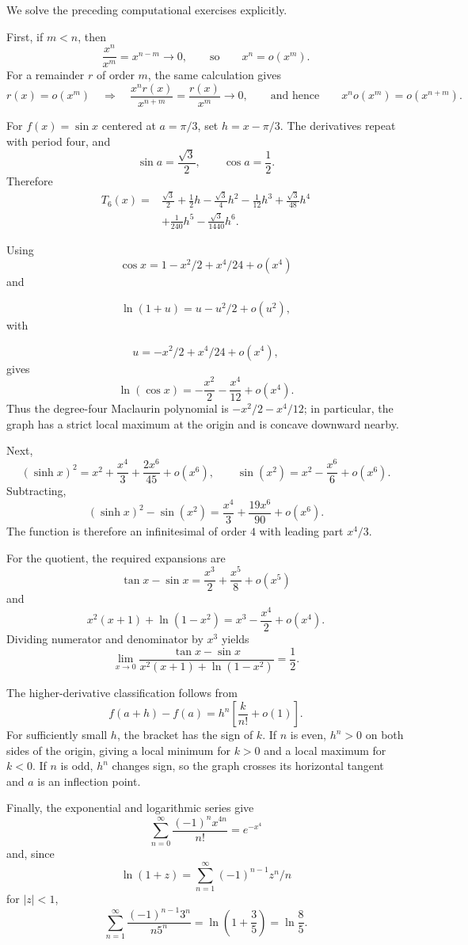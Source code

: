 \begin{remark}
We solve the preceding computational exercises explicitly.

First, if $m<n$, then
\[
\frac{x^n}{x^m}=x^{n-m}\longrightarrow0,
\qquad\text{so}\qquad
x^n=o(x^m).
\]
For a remainder $r$ of order $m$, the same calculation gives
\[
r(x)=o(x^m)
\quad\Longrightarrow\quad
\frac{x^n r(x)}{x^{n+m}}=\frac{r(x)}{x^m}\longrightarrow0,
\qquad\text{and hence}\qquad
x^n o(x^m)=o(x^{n+m}).
\]

For $f(x)=\sin x$ centered at $a=\pi/3$, set $h=x-\pi/3$.
The derivatives repeat with period four, and
\[
\sin a=\frac{\sqrt3}{2},\qquad \cos a=\frac12.
\]
Therefore
\[
\begin{aligned}
T_6(x)={}&\frac{\sqrt3}{2}+\frac12h-\frac{\sqrt3}{4}h^2
-\frac1{12}h^3+\frac{\sqrt3}{48}h^4\\
&+\frac1{240}h^5-\frac{\sqrt3}{1440}h^6.
\end{aligned}
\]

Using
\[
\cos x=1-x^2/2+x^4/24+o(x^4)
\]
 and

\[
\ln(1+u)=u-u^2/2+o(u^2),
\] with

\[
u=-x^2/2+x^4/24+o(x^4),
\] gives
\[
\ln(\cos x)=-\frac{x^2}{2}-\frac{x^4}{12}+o(x^4).
\]
Thus the degree-four Maclaurin polynomial is
$-x^2/2-x^4/12$; in particular, the graph has a strict local maximum
at the origin and is concave downward nearby.

Next,
\[
(\sinh x)^2=x^2+\frac{x^4}{3}+\frac{2x^6}{45}+o(x^6),
\qquad
\sin(x^2)=x^2-\frac{x^6}{6}+o(x^6).
\]
Subtracting,
\[
(\sinh x)^2-\sin(x^2)=\frac{x^4}{3}+\frac{19x^6}{90}+o(x^6).
\]
The function is therefore an infinitesimal of order $4$ with leading
part $x^4/3$.

For the quotient, the required expansions are
\[
\tan x-\sin x=\frac{x^3}{2}+\frac{x^5}{8}+o(x^5)
\]
 and
\[
x^2(x+1)+\ln(1-x^2)
=x^3-\frac{x^4}{2}+o(x^4).
\]
Dividing numerator and denominator by $x^3$ yields
\[
\lim_{x\to0}\frac{\tan x-\sin x}
{x^2(x+1)+\ln(1-x^2)}=\frac12.
\]

The higher-derivative classification follows from
\[
f(a+h)-f(a)=h^n\left[\frac{k}{n!}+o(1)\right].
\]
For sufficiently small $h$, the bracket has the sign of $k$. If $n$
is even, $h^n>0$ on both sides of the origin, giving a local minimum
for $k>0$ and a local maximum for $k<0$. If $n$ is odd, $h^n$ changes
sign, so the graph crosses its horizontal tangent and $a$ is an
inflection point.

Finally, the exponential and logarithmic series give \[
\sum_{n=0}^{\infty}\frac{(-1)^n x^{4n}}{n!}=e^{-x^4}
\] and, since \[
\ln(1+z)=\sum_{n=1}^{\infty}(-1)^{n-1}z^n/n
\] for
$|z|<1$,
\[
\sum_{n=1}^{\infty}\frac{(-1)^{n-1}3^n}{n5^n}
=\ln\left(1+\frac35\right)=\ln\frac85.
\]


\end{remark}
